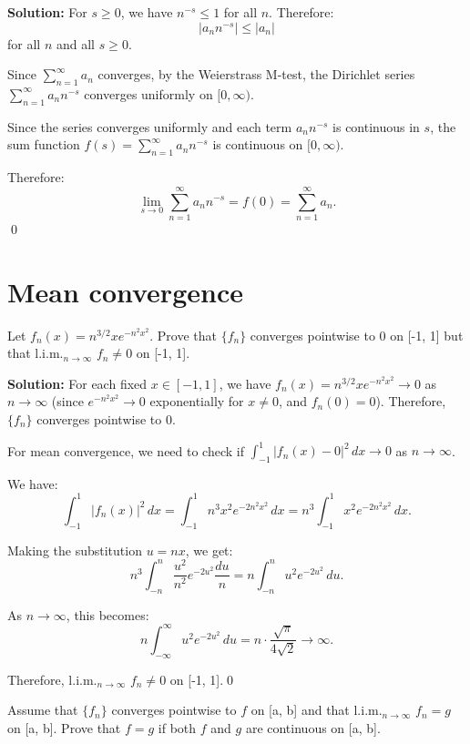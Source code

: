 \bigskip\noindent\textbf{Solution:} For \( s \geq 0 \), we have \( n^{-s} \leq 1 \) for all \( n \). Therefore:
\[|a_n n^{-s}| \leq |a_n|\]
for all \( n \) and all \( s \geq 0 \).

Since \( \sum_{n=1}^{\infty} a_n \) converges, by the Weierstrass M-test, the Dirichlet series \( \sum_{n=1}^{\infty} a_n n^{-s} \) converges uniformly on \( [0, \infty) \).

Since the series converges uniformly and each term \( a_n n^{-s} \) is continuous in \( s \), the sum function \( f(s) = \sum_{n=1}^{\infty} a_n n^{-s} \) is continuous on \( [0, \infty) \).

Therefore:
\[\lim_{s \to 0} \sum_{n=1}^{\infty} a_n n^{-s} = f(0) = \sum_{n=1}^{\infty} a_n.\]\qed
\section{Mean convergence}



\begin{problembox}
Let \( f_n(x) = n^{3/2}xe^{-n^2x^2} \). Prove that \( \{f_n\} \) converges pointwise to 0 on [-1, 1] but that l.i.m.\(_{n\to\infty}\) \( f_n \neq 0 \) on [-1, 1].
\end{problembox}

\bigskip\noindent\textbf{Solution:} For each fixed \( x \in [-1, 1] \), we have \( f_n(x) = n^{3/2}xe^{-n^2x^2} \to 0 \) as \( n \to \infty \) (since \( e^{-n^2x^2} \to 0 \) exponentially for \( x \neq 0 \), and \( f_n(0) = 0 \)). Therefore, \( \{f_n\} \) converges pointwise to 0.

For mean convergence, we need to check if \( \int_{-1}^1 |f_n(x) - 0|^2 \, dx \to 0 \) as \( n \to \infty \).

We have:
\[\int_{-1}^1 |f_n(x)|^2 \, dx = \int_{-1}^1 n^3 x^2 e^{-2n^2x^2} \, dx = n^3 \int_{-1}^1 x^2 e^{-2n^2x^2} \, dx.\]

Making the substitution \( u = nx \), we get:
\[n^3 \int_{-n}^n \frac{u^2}{n^2} e^{-2u^2} \frac{du}{n} = n \int_{-n}^n u^2 e^{-2u^2} \, du.\]

As \( n \to \infty \), this becomes:
\[n \int_{-\infty}^{\infty} u^2 e^{-2u^2} \, du = n \cdot \frac{\sqrt{\pi}}{4\sqrt{2}} \to \infty.\]

Therefore, l.i.m.\(_{n\to\infty}\) \( f_n \neq 0 \) on [-1, 1].\qed


\begin{problembox}
Assume that \( \{f_n\} \) converges pointwise to \( f \) on [a, b] and that l.i.m.\(_{n\to\infty}\) \( f_n = g \) on [a, b]. Prove that \( f = g \) if both \( f \) and \( g \) are continuous on [a, b].
\end{problembox}


